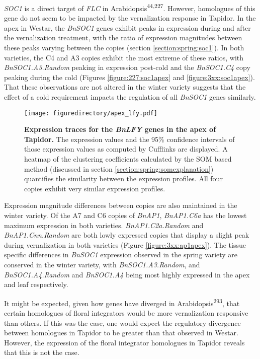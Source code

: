 \documentclass[12pt,]{book}
\begin{document}
\emph{SOC1} is a direct target of \emph{FLC} in
Arabidopsis\textsuperscript{44,227}. However, homologues of this gene do
not seem to be impacted by the vernalization response in Tapidor. In the
apex in Westar, the \emph{BnSOC1} genes exhibit peaks in expression
during and after the vernalization treatment, with the ratio of
expression magnitudes between these peaks varying between the copies
(section \ref{section:spring:soc1}). In both varieties, the C4 and A3
copies exhibit the most extreme of these ratios, with
\emph{BnSOC1.A3.Random} peaking in expression post-cold and the
\emph{BnSOC1.C4} copy peaking during the cold (Figures
\ref{figure:227:soc1apex} and \ref{figure:3xx:soc1apex}). That these
observations are not altered in the winter variety suggests that the
effect of a cold requirement impacts the regulation of all \emph{BnSOC1}
genes similarly.

\begin{figure}[htbp]
\centering
\texttt{[image: figuredirectory/apex\_lfy.pdf]}
\caption{\textbf{Expression traces for the \emph{BnLFY} genes in the
apex of Tapidor.} The expression values and the 95\% confidence
intervals of those expression values as computed by Cufflinks are
displayed. A heatmap of the clustering coefficients calculated by the
SOM based method (discussed in section
\ref{section:spring:somexplanation}) quantifies the similarity between
the expression profiles. All four copies exhibit very similar expression
profiles.}\label{figure:3xx:lfyapex}
\end{figure}

Expression magnitude differences between copies are also maintained in
the winter variety. Of the A7 and C6 copies of \emph{BnAP1},
\emph{BnAP1.C6a} has the lowest maximum expression in both varieties.
\emph{BnAP1.C2a.Random} and \emph{BnAP1.Cnn.Random} are both lowly
expressed copies that display a slight peak during vernalization in both
varieties (Figure \ref{figure:3xx:ap1apex}). The tissue specific
differences in \emph{BnSOC1} expression observed in the spring variety
are conserved in the winter variety, with \emph{BnSOC1.A3.Random}, and
\emph{BnSOC1.A4.Random} and \emph{BnSOC1.A4} being most highly expressed
in the apex and leaf respectively.

It might be expected, given how genes have diverged in
Arabidopsis\textsuperscript{293}, that certain homologues of floral
integrators would be more vernalization responsive than others. If this
was the case, one would expect the regulatory divergence between
homologues in Tapidor to be greater than that observed in Westar.
However, the expression of the floral integrator homologues in Tapidor
reveals that this is not the case.
\end{document}

